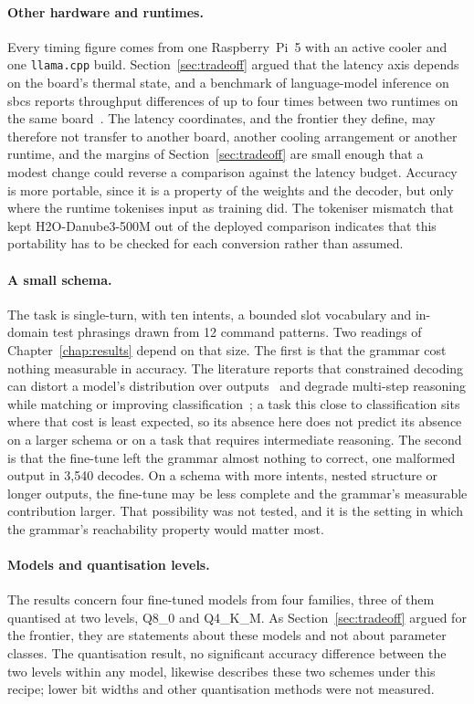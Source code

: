 \paragraph{Other hardware and runtimes.} Every timing figure comes from one Raspberry~Pi~5 with an
active cooler and one \texttt{llama.cpp} build. Section~\ref{sec:tradeoff} argued that the latency
axis depends on the board's thermal state, and a benchmark of language-model inference on \glspl{sbc} reports
throughput differences of up to four times between two runtimes on the same board~\cite{sbc2025}.
The latency coordinates, and the frontier they define, may therefore not transfer to another board,
another cooling arrangement or another runtime, and the margins of Section~\ref{sec:tradeoff} are
small enough that a modest change could reverse a comparison against the latency budget. Accuracy is
more portable, since it is a property of the weights and the decoder, but only where the runtime
tokenises input as training did. The tokeniser mismatch that kept H2O-Danube3-500M out of the
deployed comparison indicates that this portability has to be checked for each conversion rather
than assumed.

\paragraph{A small schema.} The task is single-turn, with ten intents, a bounded slot vocabulary and
in-domain test phrasings drawn from 12 command patterns. Two readings of
Chapter~\ref{chap:results} depend on that size. The first is that the grammar cost nothing
measurable in accuracy. The literature reports that constrained decoding can distort a model's
distribution over outputs~\cite{park2024} and degrade multi-step reasoning while matching or
improving classification~\cite{tam2024}; a task this close to classification sits where that cost
is least expected, so its absence here does not predict its absence on a larger schema or on a task
that requires intermediate reasoning. The second is that the fine-tune left the grammar almost
nothing to correct, one malformed output in 3{,}540 decodes. On a schema with more intents, nested
structure or longer outputs, the fine-tune may be less complete and the grammar's measurable
contribution larger. That possibility was not tested, and it is the setting in which the grammar's
reachability property would matter most.

\paragraph{Models and quantisation levels.} The results concern four fine-tuned models from four
families, three of them quantised at two levels, Q8\_0 and Q4\_K\_M. As
Section~\ref{sec:tradeoff} argued for the frontier, they are statements about these models and not
about parameter classes. The quantisation result, no significant accuracy difference between the two
levels within any model, likewise describes these two schemes under this recipe; lower bit widths
and other quantisation methods were not measured.

